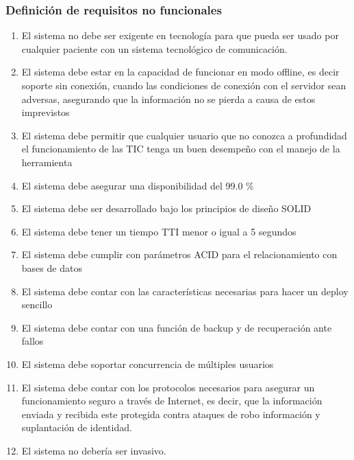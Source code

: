 \documentclass[12pt]{article}
\begin{document}
\begin{enumerate}[start=1,label={\bfseries RF0\arabic*.}]
\begin{enumerate}[label*=\arabic*.]
        


\end{enumerate}


\subsubsection{Definición de requisitos no funcionales}

\begin{enumerate}[start=1,label={\bfseries RF0\arabic*.}]


\item  El sistema no debe ser exigente en tecnología para que pueda ser usado por cualquier paciente con un sistema tecnológico de comunicación. %

\item El sistema debe estar en la capacidad de funcionar en modo offline, es decir soporte sin conexión, cuando las condiciones de conexión con el servidor sean adversas, asegurando que la información no se pierda a causa de estos imprevistos

\item El sistema debe permitir que cualquier usuario que no conozca a profundidad el funcionamiento de las TIC tenga un buen desempeño con el manejo de la herramienta

\item El sistema debe asegurar una disponibilidad del 99.0 \%

\item El sistema debe ser desarrollado bajo los principios de diseño SOLID

\item El sistema debe tener un tiempo TTI menor o igual a 5 segundos

 \item El sistema debe cumplir con parámetros ACID para el relacionamiento con bases de datos
 
\item El sistema debe contar con las características necesarias para hacer un deploy sencillo

\item El sistema debe contar con una función de backup y de recuperación ante fallos
\item El sistema debe soportar concurrencia de múltiples usuarios
\item El sistema debe contar con los protocolos necesarios para asegurar un funcionamiento seguro a través de Internet, es decir, que la información enviada y recibida este protegida contra ataques de robo información y suplantación de identidad. 
\item El sistema no debería ser invasivo.
        

\end{enumerate}
\end{enumerate}
\end{document}
